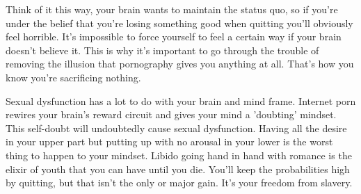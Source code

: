 \documentclass[easypeasy]{subfiles}
\begin{document}
Think of it this way, your brain wants to maintain the status quo, so if you're under the belief that you're losing something good when quitting you'll obviously feel horrible. It's impossible to force yourself to feel a certain way if your brain doesn't believe it. This is why it's important to go through the trouble of removing the illusion that pornography gives you anything at all. That's how you know you're sacrificing nothing.

Sexual dysfunction has a lot to do with your brain and mind frame. Internet porn rewires your brain's reward circuit and gives your mind a 'doubting' mindset. This self-doubt will undoubtedly cause sexual dysfunction. Having all the desire in your upper part but putting up with no arousal in your lower is the worst thing to happen to your mindset. Libido going hand in hand with romance is the elixir of youth that you can have until you die. You'll keep the probabilities high by quitting, but that isn't the only or major gain. It's your freedom from slavery.
\end{document}
